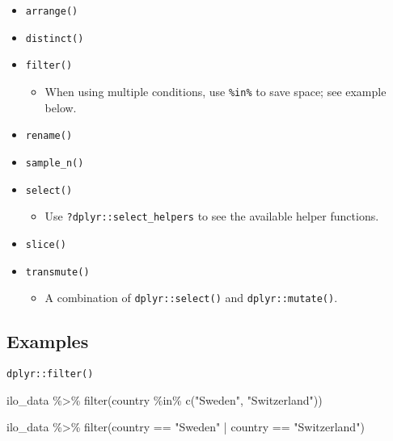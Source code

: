 \documentclass[
]{book}
\newenvironment{Shaded}{\begin{snugshade}}{\end{snugshade}}
\newcommand{\FunctionTok}[1]{\textcolor[rgb]{0.00,0.00,0.00}{#1}}
\newcommand{\NormalTok}[1]{#1}
\newcommand{\SpecialCharTok}[1]{\textcolor[rgb]{0.00,0.00,0.00}{#1}}
\newcommand{\StringTok}[1]{\textcolor[rgb]{0.31,0.60,0.02}{#1}}
\providecommand{\tightlist}{%
  \setlength{\itemsep}{0pt}\setlength{\parskip}{0pt}}
\begin{document}
\begin{itemize}
\tightlist
\item
  \texttt{arrange()}
\item
  \texttt{distinct()}
\item
  \texttt{filter()}

  \begin{itemize}
  \tightlist
  \item
    When using multiple \texttt{\textbar{}} conditions, use \texttt{\%in\%} to save space; see example below.
  \end{itemize}
\item
  \texttt{rename()}
\item
  \texttt{sample\_n()}
\item
  \texttt{select()}

  \begin{itemize}
  \tightlist
  \item
    Use \texttt{?dplyr::select\_helpers} to see the available helper functions.
  \end{itemize}
\item
  \texttt{slice()}
\item
  \texttt{transmute()}

  \begin{itemize}
  \tightlist
  \item
    A combination of \texttt{dplyr::select()} and \texttt{dplyr::mutate()}.
  \end{itemize}
\end{itemize}

\hypertarget{examples-4}{%
\subsection{Examples}\label{examples-4}}

\texttt{dplyr::filter()}

\begin{Shaded}
\begin{Highlighting}[]
\NormalTok{ilo\_data }\SpecialCharTok{\%\textgreater{}\%} 
  \FunctionTok{filter}\NormalTok{(country }\SpecialCharTok{\%in\%} \FunctionTok{c}\NormalTok{(}\StringTok{"Sweden"}\NormalTok{, }\StringTok{"Switzerland"}\NormalTok{))}

\NormalTok{ilo\_data }\SpecialCharTok{\%\textgreater{}\%} 
  \FunctionTok{filter}\NormalTok{(country }\SpecialCharTok{==} \StringTok{"Sweden"} \SpecialCharTok{|}\NormalTok{ country }\SpecialCharTok{==} \StringTok{"Switzerland"}\NormalTok{)}
\end{Highlighting}
\end{Shaded}
\end{document}
